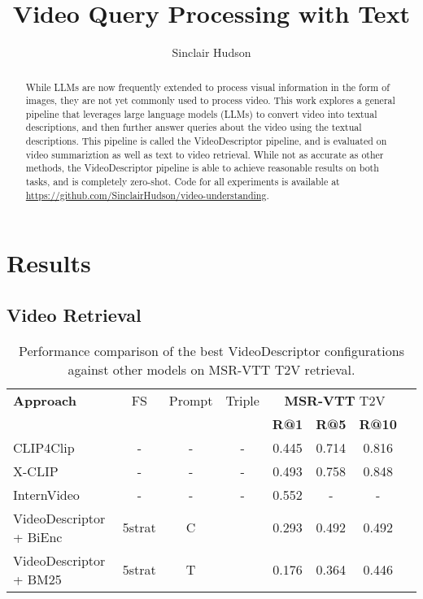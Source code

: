 \documentclass{article}
\title{Video Query Processing with Text}
\author{Sinclair Hudson}
\begin{document}
\maketitle

\begin{abstract}
      While LLMs are now frequently extended to process visual information in the form of images, they are not yet commonly used to process video.
      This work explores a general pipeline that leverages large language models (LLMs) to convert video into textual descriptions, and then further answer queries about the video using the textual descriptions.
      This pipeline is called the VideoDescriptor pipeline, and is evaluated on video summariztion as well as text to video retrieval.
      While not as accurate as other methods, the VideoDescriptor pipeline is able to achieve reasonable results on both tasks, and is completely zero-shot.
      Code for all experiments is available at \url{https://github.com/SinclairHudson/video-understanding}.
\end{abstract}







\section{Results}

\subsection{Video Retrieval}

\begin{table}[htbp]
  \centering
  \begin{tabular}{lccccccc}
    \toprule
    \textbf{Approach} &FS & Prompt & Triple & \multicolumn{3}{c}{\textbf{MSR-VTT} T2V} \\
    \cmidrule(lr){5-7}
                      &&&& \textbf{R@1} & \textbf{R@5} & \textbf{R@10} \\
    \midrule
    CLIP4Clip \cite{clip4clip} &-&-&-& 0.445 & 0.714 &  0.816\\
    \midrule
    X-CLIP \cite{xclip} &-&-&-& 0.493 & 0.758 & 0.848 \\
    \midrule
    InternVideo \cite{internvideo} &-&-&-& 0.552 & - & - \\
    \bottomrule
    VideoDescriptor + BiEnc &5strat&C& & 0.293 & 0.492 & 0.492 \\
    \midrule
    VideoDescriptor + BM25 &5strat&T& & 0.176 & 0.364 & 0.446 \\
  \end{tabular}
  \label{tab:model_comparison}
  \caption{Performance comparison of the best VideoDescriptor configurations against other models on MSR-VTT T2V retrieval.}
\end{table}
\end{document}
